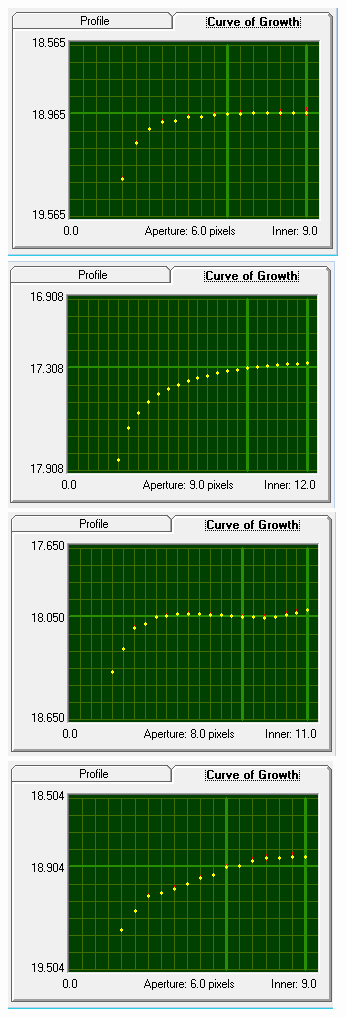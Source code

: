 \documentclass[12pt]{article}
\begin{document}
\begin{figure}[H]
\centering
\begin{multicols}{2}
\includegraphics[scale=1.0]{Images/AsImages/SS/Sr1-Growth.PNG} \\ [0.2cm]
\includegraphics[scale=1.0]{Images/AsImages/SS/Sr3-Growth.PNG}
\includegraphics[scale=1.0]{Images/AsImages/SS/Sr2-Growth.PNG} \\ [0.2cm]
\includegraphics[scale=1.0]{Images/AsImages/SS/Sr4-Growth.PNG}

\end{multicols}
\end{figure}
\end{document}
